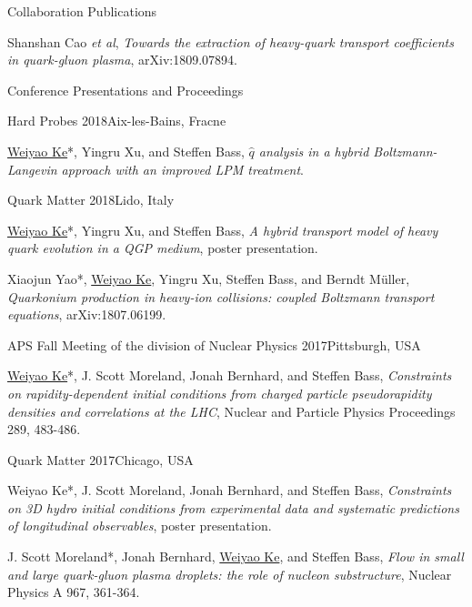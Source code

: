 \documentclass{resume} %
\begin{document}
\begin{rSection}{Collaboration Publications}
\vspace{.3em}
\begin{Article}
\item Shanshan Cao {\it et al}, {\it Towards the extraction of heavy-quark transport coefficients in quark-gluon plasma}, arXiv:1809.07894.
\end{Article}
\end{rSection}


\begin{rSection}{Conference Presentations and Proceedings}
\begin{Conference}{Hard Probes 2018}{Aix-les-Bains, Fracne}
\item \underline{Weiyao Ke}*, Yingru Xu, and Steffen Bass, {\it $\hat{q}$ analysis in a hybrid Boltzmann-Langevin approach with an improved LPM treatment}. 
\end{Conference}

\begin{Conference}{Quark Matter 2018}{Lido, Italy}
\item \underline{Weiyao Ke}*, Yingru Xu, and Steffen Bass, {\it A hybrid transport model of heavy quark evolution in a QGP medium}, poster presentation.
\item Xiaojun Yao*, \underline{Weiyao Ke}, Yingru Xu, Steffen Bass, and Berndt M\"uller, {\it Quarkonium production in heavy-ion collisions: coupled Boltzmann transport equations}, arXiv:1807.06199. 
\end{Conference}

\begin{Conference}{APS Fall Meeting of the division of Nuclear Physics 2017}{Pittsburgh, USA}
\item \underline{Weiyao Ke}*, J. Scott Moreland, Jonah Bernhard, and Steffen Bass, {\it Constraints on rapidity-dependent initial conditions from charged particle pseudorapidity densities and correlations at the LHC}, Nuclear and Particle Physics Proceedings 289, 483-486.
\end{Conference}

\begin{Conference}{Quark Matter 2017}{Chicago, USA}
\item {Weiyao Ke}*, J. Scott Moreland, Jonah Bernhard, and Steffen Bass, {\it Constraints on 3D hydro initial conditions from experimental data and systematic predictions of longitudinal observables}, poster presentation.
\item J. Scott Moreland*, Jonah Bernhard, \underline{Weiyao Ke}, and Steffen Bass, {\it Flow in small and large quark-gluon plasma droplets: the role of nucleon substructure}, Nuclear Physics A 967, 361-364.
\end{Conference}


\end{rSection}
\end{document}
